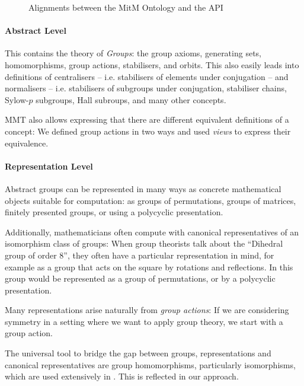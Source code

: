 \begin{figure}[ht]\centering
  \caption{Alignments between the MitM Ontology and the \GAP API}\label{fig:cgtontology}
\end{figure}

\paragraph{Abstract Level} This contains the theory of \emph{Groups}: the group axioms, generating sets, homomorphisms, group actions, stabilisers, and orbits.  
This also easily leads into definitions of centralisers -- i.e. stabilisers of elements under conjugation -- and normalisers -- i.e. stabilisers of subgroups under conjugation, stabiliser chains, Sylow-$p$ subgroups, Hall subroups, and many other concepts.

MMT also allows expressing that there are different equivalent definitions of a
concept: We defined group actions in two ways and used \emph{views} to express
their equivalence.

\paragraph{Representation Level} 
Abstract groups can be represented in many ways as concrete mathematical
objects suitable for computation: as groups of permutations, groups of matrices,
finitely presented groups, or using a polycyclic presentation.

Additionally, mathematicians often compute with canonical representatives of an isomorphism class of groups: When group theorists talk about the ``Dihedral group of order 8'', they often have a particular representation in mind, for example as a group that acts on the square by rotations and reflections. 
In \GAP this group would be represented as a group of permutations, or by a polycyclic presentation.

Many representations arise naturally from \emph{group actions}: If we are
considering symmetry in a setting where we want to apply group theory, we start
with a group action.

The universal tool to bridge the gap between groups, representations and
canonical representatives are group homomorphisms, particularly isomorphisms,
which are used extensively in \GAP. This is reflected in our approach.

